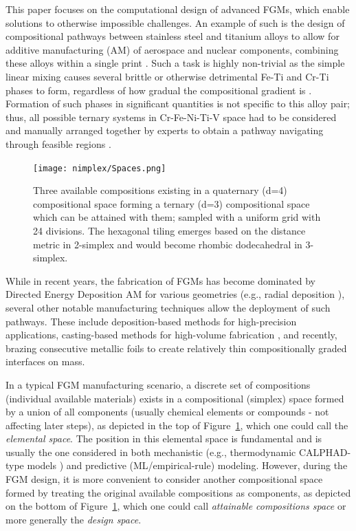 This paper focuses on the computational design of advanced FGMs, which enable solutions to otherwise impossible challenges. An example of such is the design of compositional pathways between stainless steel and titanium alloys to allow for additive manufacturing (AM) of aerospace and nuclear components, combining these alloys within a single print \cite{Bobbio2022DesignCompositions}. Such a task is highly non-trivial as the simple linear mixing causes several brittle or otherwise detrimental Fe-Ti and Cr-Ti phases to form, regardless of how gradual the compositional gradient is \cite{Reichardt2016DevelopmentManufacturing}. Formation of such phases in significant quantities is not specific to this alloy pair; thus, all possible ternary systems in Cr-Fe-Ni-Ti-V space had to be considered and manually arranged together by experts to obtain a pathway navigating through feasible regions \cite{Bobbio2022DesignCompositions}.


\begin{figure}[H]
    \centering
    \texttt{[image: nimplex/Spaces.png]}
    \caption{Three available compositions existing in a quaternary (d=4) compositional space forming a ternary (d=3) compositional space which can be attained with them; sampled with a uniform grid with 24 divisions. The hexagonal tiling emerges based on the distance metric in 2-simplex and would become rhombic dodecahedral in 3-simplex.} 
    \label{nimplex:fig:fgmspaces}
\end{figure}

While in recent years, the fabrication of FGMs has become dominated by Directed Energy Deposition AM for various geometries (e.g., radial deposition \cite{Hofmann2014DevelopingManufacturing}), several other notable manufacturing techniques allow the deployment of such pathways. These include deposition-based methods for high-precision applications, casting-based methods for high-volume fabrication \cite{Saleh202030Challenges}, and recently, brazing consecutive metallic foils \cite{Wu2023ATechnology} to create relatively thin compositionally graded interfaces on mass.

In a typical FGM manufacturing scenario, a discrete set of compositions (individual available materials) exists in a compositional (simplex) space formed by a union of all components (usually chemical elements or compounds - not affecting later steps), as depicted in the top of Figure~\ref{nimplex:fig:fgmspaces}, which one could call the \emph{elemental space}. The position in this elemental space is fundamental and is usually the one considered in both mechanistic (e.g., thermodynamic CALPHAD-type models \cite{Olson2023GenomicDynamics}) and predictive (ML/empirical-rule) modeling. However, during the FGM design, it is more convenient to consider another compositional space formed by treating the original available compositions as components, as depicted on the bottom of Figure~\ref{nimplex:fig:fgmspaces}, which one could call \emph{attainable compositions space} or more generally the \emph{design space}.


